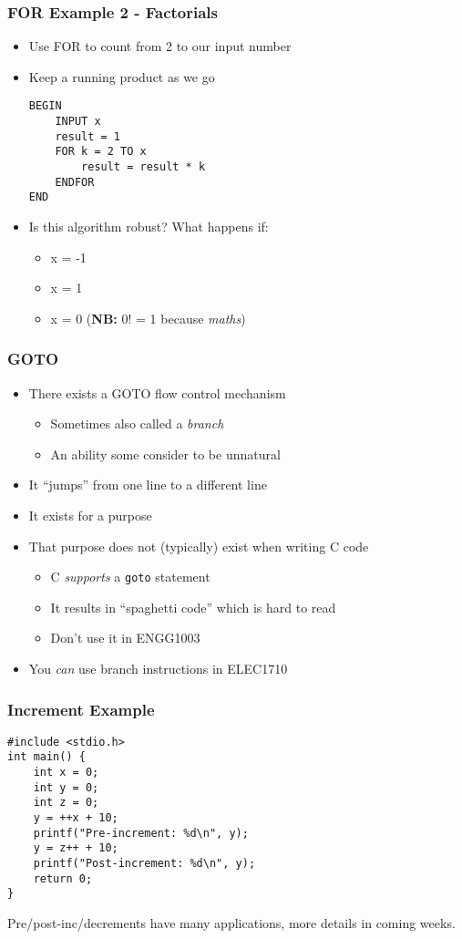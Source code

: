 \documentclass[14pt]{beamer}
\begin{document}
\begin{frame}[fragile]
\frametitle{FOR Example 2 - Factorials}
\begin{itemize}
\item Use FOR to count from 2 to our input number
\item Keep a running product as we go
\begin{lstlisting}[style=pseudo]
BEGIN
	INPUT x
	result = 1
	FOR k = 2 TO x
		result = result * k
	ENDFOR
END
\end{lstlisting}
\item Is this algorithm robust? What happens if:
	\begin{itemize}
		\item x = -1
		\item x = 1
		\item x = 0 (\textbf{NB:} 0! = 1 because \textit{maths})
	\end{itemize}
\end{itemize}
\end{frame}

\begin{frame}
\frametitle{GOTO}
\begin{itemize}
\item There exists a GOTO flow control mechanism
	\begin{itemize}
		\item Sometimes also called a \textit{branch}
		\item An ability some consider to be unnatural
	\end{itemize}
\item It ``jumps'' from one line to a different line
\item It exists for a purpose
\item That purpose does not (typically) exist when writing C code
	\begin{itemize}
		\item C \textit{supports} a \texttt{goto} statement
		\item It results in ``spaghetti code'' which is hard to read
		\item Don't use it in ENGG1003
	\end{itemize}
\item You \textit{can} use branch instructions in ELEC1710
\end{itemize}
\end{frame}

\begin{frame}[fragile]
\frametitle{Increment Example}
\begin{lstlisting}[style=CStyle,caption=\texttt{increment.c}]
#include <stdio.h>
int main() {
	int x = 0;
	int y = 0;
	int z = 0;
	y = ++x + 10;
	printf("Pre-increment: %d\n", y);
	y = z++ + 10;
	printf("Post-increment: %d\n", y);
	return 0;
}
\end{lstlisting}
Pre/post-inc/decrements have many applications, more details in coming weeks.
\end{frame}
\end{document}
